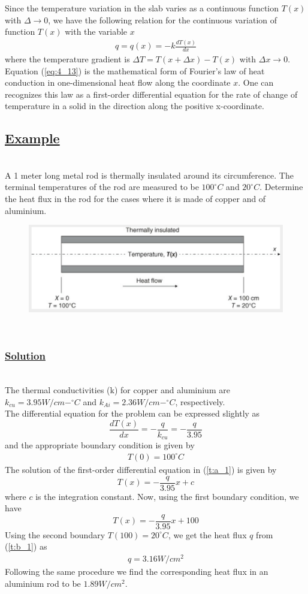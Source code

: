\documentclass[11pt]{report}
\newcommand{\ubt}[1]{\textbf{\underline{#1}}}
\newcommand{\sps}{\\[0.2cm]}
\newcommand{\spn}[1]{\\[#1cm]}
\newcommand{\refn}[1]{(\ref{#1})}
\newcommand{\refx}[1]{\refn{eq:#1}}
\newcommand{\solution}{\subsubsection{\ubt{Solution}}{~}\spn{-1}}
\newcommand{\eg}{\subsection*{\ubt{Example}}{~}\spn{-1}}
\begin{document}
	Since the temperature variation in the slab varies as a continuous function $T(x)$ with $\Delta\to 0$, we have the following relation for the continuous variation of function $T(x)$ with the variable $x$
	\begin{eqnarray}
		q = q(x) = -k\frac{dT(x)}{dx}\label{eq:4_13}
	\end{eqnarray}
	where the temperature gradient is $\Delta T = T(x+\Delta x) - T(x)$ with $\Delta x \to 0$. Equation \refx{4_13} is the mathematical form of Fourier's law of heat conduction in one-dimensional heat flow along the coordinate $x$. One can recognizes this law as a first-order differential equation for the rate of change of temperature in a solid in the direction along the positive x-coordinate.
	
	\eg
	A 1 meter long metal rod is thermally insulated around its circumference. The terminal temperatures of the rod are measured to be $100^{\circ}C$ and $20^{\circ}C$. Determine the heat flux in the rod for the cases where it is made of copper and of aluminium.
	\begin{figure}[h!]
		\centering
		\includegraphics[width=0.8\linewidth]{heatflow}
	\end{figure}
	{~}\spn{-1.3}
	\solution
	The thermal conductivities (k) for copper and aluminium are $k_{cu}=3.95W/cm-^{\circ}C$ and $k_{Ai} = 2.36W/cm-^{\circ}C$, respectively. \sps
	The differential equation for the problem can be expressed slightly as
	\begin{equation}
		\frac{dT(x)}{dx} = - \frac{q}{k_{cu}} = -\frac{q}{3.95}\tag{a}\label{t:a_1}
	\end{equation}
	and the appropriate boundary condition is given by
	\begin{eqnarray*}
		T(0) = 100^{\circ}C
	\end{eqnarray*}
	The solution of the first-order differential equation in \refn{t:a_1} is given by
	\begin{equation*}
		T(x) = -\frac{q}{3.95}x + c
	\end{equation*}
	where $c$ is the integration constant. Now, using the first boundary condition, we have
	\begin{equation}
		T(x) = -\frac{q}{3.95}x + 100\tag{b}\label{t:b_1}
	\end{equation}
	Using the second boundary $T(100)=20^{\circ}C$, we get the heat flux $q$ from \refn{t:b_1} as
	\begin{eqnarray*}
		q = 3.16 W/cm^2
	\end{eqnarray*}
	Following the same procedure we find the corresponding heat flux in an aluminium rod to be $1.89 W/cm^2$.
	
\end{document}
